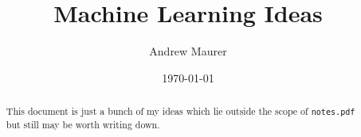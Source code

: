 \documentclass[12pt,draft,reqno]{amsart}
\begin{document}
\title{Machine Learning Ideas}
\author{Andrew Maurer}
\date{\today}

\maketitle


\begin{abstract}
  This document is just a bunch of my ideas which lie outside the scope of \texttt{notes.pdf} but still may be worth writing down.
\end{abstract}

\begin{center}
  \parbox{4.7in}{
    \tableofcontents
    }
\end{center}




\appendix

\vfill
\end{document}
